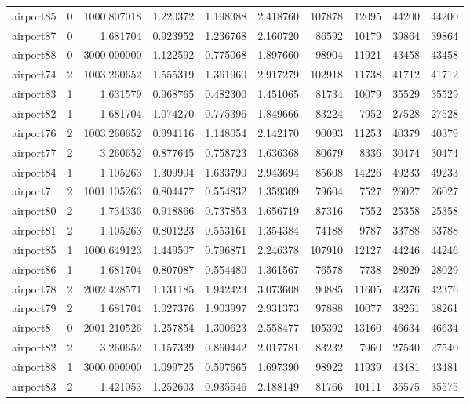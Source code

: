 \begin{longtable}{|l|r|r|r|r|r|r|r|r|r|}
airport85 & 0 & 1000.807018 & 1.220372 & 1.198388 & 2.418760 & 107878 & 12095 & 44200 & 44200 \\
airport87 & 0 & 1.681704 & 0.923952 & 1.236768 & 2.160720 & 86592 & 10179 & 39864 & 39864 \\
airport88 & 0 & 3000.000000 & 1.122592 & 0.775068 & 1.897660 & 98904 & 11921 & 43458 & 43458 \\
airport74 & 2 & 1003.260652 & 1.555319 & 1.361960 & 2.917279 & 102918 & 11738 & 41712 & 41712 \\
airport83 & 1 & 1.631579 & 0.968765 & 0.482300 & 1.451065 & 81734 & 10079 & 35529 & 35529 \\
airport82 & 1 & 1.681704 & 1.074270 & 0.775396 & 1.849666 & 83224 & 7952 & 27528 & 27528 \\
airport76 & 2 & 1003.260652 & 0.994116 & 1.148054 & 2.142170 & 90093 & 11253 & 40379 & 40379 \\
airport77 & 2 & 3.260652 & 0.877645 & 0.758723 & 1.636368 & 80679 & 8336 & 30474 & 30474 \\
airport84 & 1 & 1.105263 & 1.309904 & 1.633790 & 2.943694 & 85608 & 14226 & 49233 & 49233 \\
airport7 & 2 & 1001.105263 & 0.804477 & 0.554832 & 1.359309 & 79604 & 7527 & 26027 & 26027 \\
airport80 & 2 & 1.734336 & 0.918866 & 0.737853 & 1.656719 & 87316 & 7552 & 25358 & 25358 \\
airport81 & 2 & 1.105263 & 0.801223 & 0.553161 & 1.354384 & 74188 & 9787 & 33788 & 33788 \\
airport85 & 1 & 1000.649123 & 1.449507 & 0.796871 & 2.246378 & 107910 & 12127 & 44246 & 44246 \\
airport86 & 1 & 1.681704 & 0.807087 & 0.554480 & 1.361567 & 76578 & 7738 & 28029 & 28029 \\
airport78 & 2 & 2002.428571 & 1.131185 & 1.942423 & 3.073608 & 90885 & 11605 & 42376 & 42376 \\
airport79 & 2 & 1.681704 & 1.027376 & 1.903997 & 2.931373 & 97888 & 10077 & 38261 & 38261 \\
airport8 & 0 & 2001.210526 & 1.257854 & 1.300623 & 2.558477 & 105392 & 13160 & 46634 & 46634 \\
airport82 & 2 & 3.260652 & 1.157339 & 0.860442 & 2.017781 & 83232 & 7960 & 27540 & 27540 \\
airport88 & 1 & 3000.000000 & 1.099725 & 0.597665 & 1.697390 & 98922 & 11939 & 43481 & 43481 \\
airport83 & 2 & 1.421053 & 1.252603 & 0.935546 & 2.188149 & 81766 & 10111 & 35575 & 35575 \\

\end{longtable}
